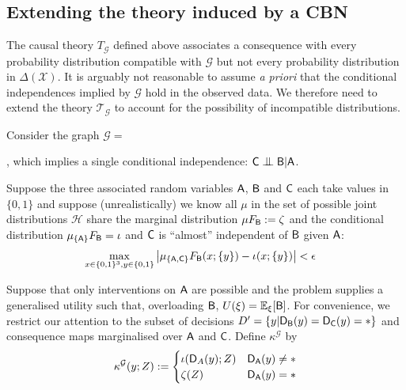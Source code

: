 \subsection{Extending the theory induced by a CBN}

The causal theory $T_{\mathcal{G}}$ defined above associates a consequence with every probability distribution compatible with $\mathcal{G}$ but not every probability distribution in $\Delta(\mathcal{X})$. It is arguably not reasonable to assume \emph{a priori} that the conditional independences implied by $\mathcal{G}$ hold in the observed data. We therefore need to extend the theory $\mathscr{T}_{\mathcal{G}}$ to account for the possibility of incompatible distributions.

\begin{example}\label{ex:extn_cbn}

Consider the graph $\mathcal{G}=$, which implies a single conditional independence: $\RV{C}\CI \RV{B}|\RV{A}$.

Suppose the three associated random variables $\mathsf{A}$, $\mathsf{B}$ and $\mathsf{C}$ each take values in $\{0,1\}$ and suppose (unrealistically) we know all $\mu$ in the set of possible joint distributions $\mathscr{H}$ share the marginal distribution $\mu F_{\mathsf{B}} := \zeta$ and the conditional distribution $\mu_{\{\mathsf{A}\}} F_{\mathsf{B}} = \iota$ and $\mathsf{C}$ is ``almost'' independent of $\mathsf{B}$ given $\mathsf{A}$:
\begin{align}
    \max_{x\in\{0,1\}^3,y\in\{0,1\}}\left|\mu_{\{\mathsf{A},\mathsf{C}\}} F_{\mathsf{B}}(x;\{y\}) - \iota(x;\{y\}) \right| &< \epsilon \label{eq:app_ci}
\end{align}

Suppose that only interventions on $\mathsf{A}$ are possible and the problem supplies a generalised utility such that, overloading $\mathsf{B}$, $U(\xi)=\mathbb{E}_{\xi}[\mathsf{B}]$. For convenience, we restrict our attention to the subset of decisions $D'=\{y|\mathsf{D}_{\mathsf{B}}(y)=\mathsf{D}_{\mathsf{C}}(y)=*\}$ and consequence maps marginalised over $\mathsf{A}$ and $\mathsf{C}$. Define $\kappa^{\mathcal{G}}$ by
\begin{align}
    \kappa^{\mathcal{G}}(y;Z) := \begin{cases} \iota(\mathsf{D}_A(y);Z) & \mathsf{D}_{\mathsf{A}}(y) \neq *\\
                                              \zeta(Z) & \mathsf{D}_{\mathsf{A}}(y) = *\end{cases}
\end{align}


\end{example}
